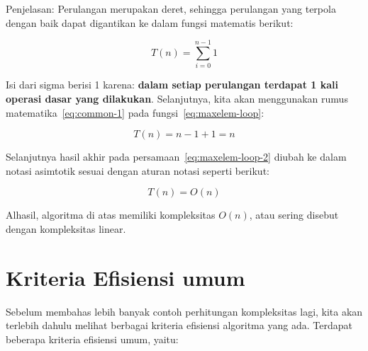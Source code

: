 \FloatBarrier

Penjelasan: Perulangan merupakan deret, sehingga perulangan yang terpola dengan baik dapat digantikan ke dalam fungsi matematis berikut:

\begin{equation}\label{eq:maxelem-loop}
    T(n) = \sum\limits_{i=0}^{n-1} 1
\end{equation}

Isi dari sigma berisi 1 karena: \textbf{dalam setiap perulangan terdapat 1 kali operasi dasar yang dilakukan}. Selanjutnya, kita akan menggunakan rumus matematika~\ref{eq:common-1} pada fungsi~\ref{eq:maxelem-loop}:

\begin{equation}\label{eq:maxelem-loop-2}
T(n) = n - 1 + 1 = n
\end{equation}

Selanjutnya hasil akhir pada persamaan~\ref{eq:maxelem-loop-2} diubah ke dalam notasi asimtotik sesuai dengan aturan notasi seperti berikut:

$$
T(n) = O(n)
$$

Alhasil, algoritma di atas memiliki kompleksitas $O(n)$, atau sering disebut dengan kompleksitas linear.

\section{Kriteria Efisiensi umum}

Sebelum membahas lebih banyak contoh perhitungan kompleksitas lagi, kita akan terlebih dahulu melihat berbagai kriteria efisiensi algoritma yang ada. Terdapat beberapa kriteria efisiensi umum, yaitu:


